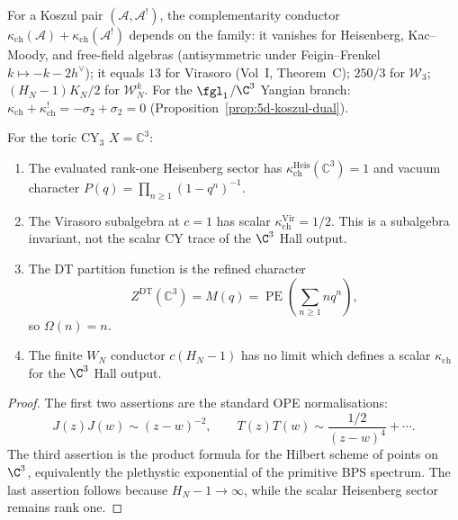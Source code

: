 \begin{remark}
\label{rem:phys-anom-complementarity}
For a Koszul pair $(\mathcal{A}, \mathcal{A}^!)$, the complementarity conductor $\kappa_{\mathrm{ch}}(\mathcal{A}) + \kappa_{\mathrm{ch}}(\mathcal{A}^!)$ depends on the family: it vanishes for Heisenberg, Kac--Moody, and free-field algebras (antisymmetric under Feigin--Frenkel $k \mapsto -k-2h^\vee$); it equals $13$ for Virasoro (Vol~I, Theorem~C); $250/3$ for $\mathcal{W}_3$; $(H_N-1)K_N/2$ for $\mathcal{W}_N^k$. For the $\fgl_1$/$\C^3$ Yangian branch: $\kappa_{\mathrm{ch}} + \kappa_{\mathrm{ch}}^! = -\sigma_2 + \sigma_2 = 0$ (Proposition~\ref{prop:5d-koszul-dual}).
\end{remark}

\begin{proposition}
\label{prop:phys-anom-toric-genus1}
For the toric CY$_3$ \(X=\mathbb C^3\):
\begin{enumerate}[label=\textup{(\roman*)}]
 \item The evaluated rank-one Heisenberg sector has
 \(\kappa_{\mathrm{ch}}^{\mathrm{Heis}}(\mathbb C^3)=1\) and vacuum
 character \(P(q)=\prod_{n\geq 1}(1-q^n)^{-1}\).
 \item The Virasoro subalgebra at \(c=1\) has scalar
 \(\kappa_{\mathrm{ch}}^{\mathrm{Vir}}=1/2\). This is a subalgebra
 invariant, not the scalar CY trace of the \(\C^3\) Hall output.
 \item The DT partition function is the refined character
 \[
  Z^{\mathrm{DT}}(\mathbb C^3)=M(q)
  =\operatorname{PE}\!\left(\sum_{n\geq 1}nq^n\right),
 \]
 so \(\Omega(n)=n\).
 \item The finite \(W_N\) conductor \(c(H_N-1)\) has no limit which
 defines a scalar \(\kappa_{\mathrm{ch}}\) for the \(\C^3\) Hall output.
\end{enumerate}
\end{proposition}

\begin{proof}
The first two assertions are the standard OPE normalisations:
\[
 J(z)J(w)\sim (z-w)^{-2},
 \qquad
 T(z)T(w)\sim \frac{1/2}{(z-w)^4}+\cdots .
\]
The third assertion is the product formula for the Hilbert scheme of
points on \(\C^3\), equivalently the plethystic exponential of the
primitive BPS spectrum. The last assertion follows because
\(H_N-1\to\infty\), while the scalar Heisenberg sector remains rank one.
\end{proof}


